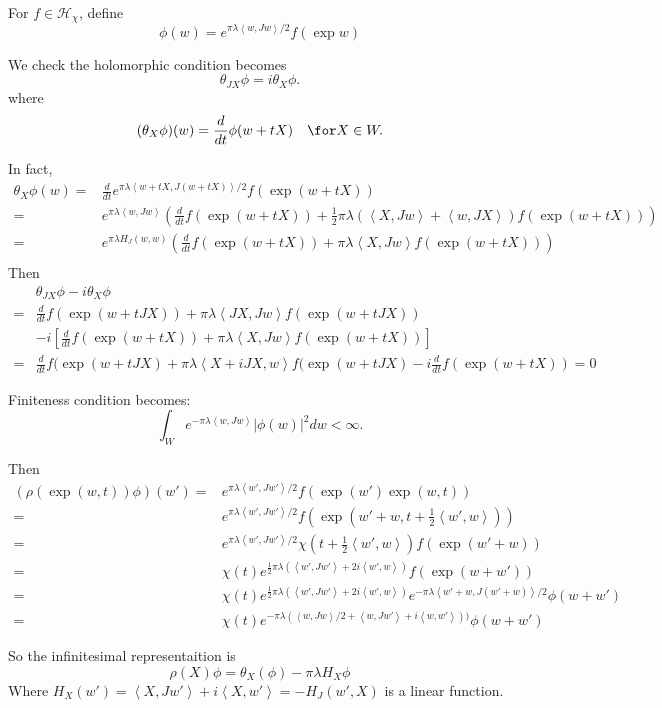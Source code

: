 \documentclass[12pt]{amsart}
\def\inn#1#2{\left\langle{#1},{#2}\right\rangle}
\def\abs#1{\left|{#1}\right|}
\def\chh{\mathcal{H}}
\def\ddt{\frac{d}{dt}}
\begin{document}
For $f\in \chh_\chi$, define
\[
\phi(w) = e^{\pi \lambda \inn{w}{Jw}/2} f(\exp w) 
\] 

We check the holomorphic condition becomes 
\[
\theta_{JX} \phi = i \theta_{X} \phi.
\]
where 
\[
(\theta_X \phi)(w) = \frac{d}{dt}\phi(w+tX) \quad \for X\in W.
\]

In fact, 
\[
\begin{split}
\theta_X \phi(w) =& \ddt e^{\pi \lambda \inn{w+tX}{J(w+tX)}/2} f(\exp(w+tX))\\
= &  e^{\pi \lambda \inn{w}{Jw}}(\ddt f(\exp(w+tX)) 
+ \frac{1}{2}\pi\lambda (\inn{X}{Jw}+\inn{w}{JX}) f(\exp(w+tX))) \\
= &  e^{\pi \lambda H_J(w,w)}(\ddt f(\exp(w+tX)) + \pi\lambda \inn{X}{Jw} f(\exp(w+tX))) \\
\end{split}
\] 
Then 
\[
\begin{split}
&\theta_{JX}\phi - i\theta_{X}\phi \\
= & \ddt f(\exp(w+tJX)) + \pi\lambda \inn{JX}{Jw} f(\exp(w+tJX))\\
&-i \left[ \ddt f(\exp(w+tX)) + \pi\lambda \inn{X}{Jw} f(\exp(w+tX))\right]\\
=& \ddt f(\exp(w+tJX)  + \pi \lambda \inn{X+iJX}{w} f(\exp(w+tJX)
- i \ddt f(\exp(w+tX))= 0 
\end{split}
\]

Finiteness condition becomes:
\[
\int_W e^{-\pi \lambda \inn{w}{Jw}}\abs{\phi(w)}^2dw < \infty.
\]

Then
\[
\begin{split}
(\rho(\exp(w,t))\phi)(w') =& e^{\pi \lambda \inn{w'}{Jw'}/2} f(\exp(w') \exp(w,t))\\
=& e^{\pi \lambda \inn{w'}{Jw'}/2} f(\exp(w'+w,t+ \frac{1}{2}\inn{w'}{w}))\\
=& e^{\pi \lambda \inn{w'}{Jw'}/2} \chi(t+ \frac{1}{2}\inn{w'}{w}) f(\exp(w'+w))\\
=& \chi(t) e^{\frac{1}{2}\pi \lambda (\inn{w'}{Jw'}+2i \inn{w'}{w})}
 f(\exp(w+w')) \\
=& \chi(t) e^{\frac{1}{2}\pi \lambda (\inn{w'}{Jw'}+2i \inn{w'}{w})} 
e^{-\pi \lambda \inn{w'+w}{J(w'+w)}/2} \phi(w+w')\\
=& \chi(t) e^{-\pi \lambda (\inn{w}{Jw}/2+ \inn{w}{Jw'}+i\inn{w}{w'}))} 
 \phi(w+w') 
\end{split}
\]


So the infinitesimal representaition is 
\[
\rho(X) \phi = \theta_X(\phi) -\pi\lambda H_X \phi
\]
Where $H_X(w') =\inn{X}{Jw'} + i\inn{X}{w'} = -H_J(w',X)$ is a linear function.
\end{document}
